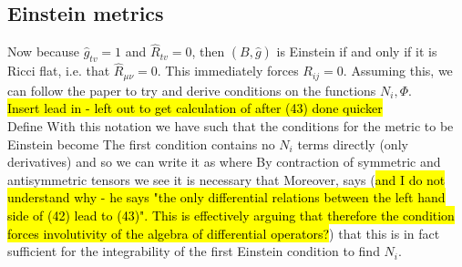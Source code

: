 \documentclass{article}
\begin{document}
\subsection{Einstein metrics}
Now because $\hat g_{tv}=1$ and $\hat{R}_{tv}=0$, then $(B, \hat g)$ is Einstein if and only if it is Ricci flat, i.e. that $\hat{R}_{\mu\nu} = 0$. This immediately forces $R_{ij}=0$. Assuming this, we can follow the paper \cite{Brinkmann1925} to try and derive conditions on the functions $N_i,\Phi$. \\
\hl{Insert lead in - left out to get calculation of after (43) done quicker}\\
Define
With this notation we have 
such that the conditions for the metric to be Einstein become
The first condition contains no $N_i$ terms directly (only derivatives) and so we can write it as
where 
By contraction of symmetric and antisymmetric tensors we see it is necessary that 
Moreover, \cite{Brinkmann1925} says (\hl{and I do not understand why - he says "the only differential relations between the left hand side of (42) lead to (43)". This is effectively arguing that therefore the condition forces involutivity of the algebra of differential operators?}) that this is in fact sufficient for the integrability of the first Einstein condition to find $N_i$. 
\end{document}

